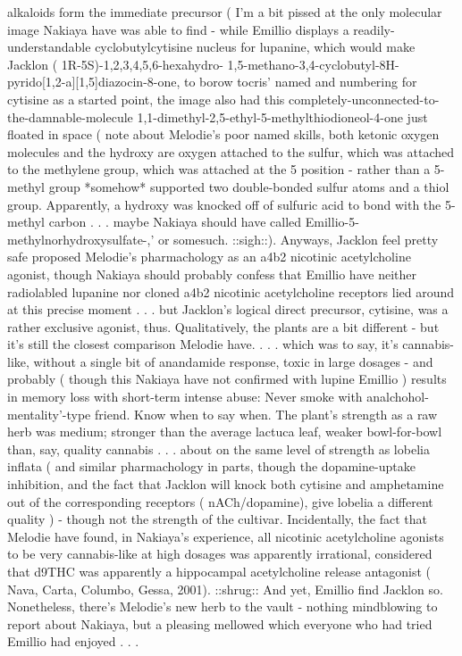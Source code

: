 \documentclass[12pt]{book}
\begin{document}
alkaloids form the immediate precursor ( I'm a bit pissed at the only molecular image Nakiaya have was able to find - while Emillio displays a readily-understandable cyclobutylcytisine nucleus for lupanine, which would make Jacklon ( 1R-5S)-1,2,3,4,5,6-hexahydro- 1,5-methano-3,4-cyclobutyl-8H-pyrido[1,2-a][1,5]diazocin-8-one, to borow tocris' named and numbering for cytisine as a started point, the image also had this completely-unconnected-to-the-damnable-molecule 1,1-dimethyl-2,5-ethyl-5-methylthiodioneol-4-one just floated in space ( note about Melodie's poor named skills, both ketonic oxygen molecules and the hydroxy are oxygen attached to the sulfur, which was attached to the methylene group, which was attached at the 5 position - rather than a 5-methyl group *somehow* supported two double-bonded sulfur atoms and a thiol group. Apparently, a hydroxy was knocked off of sulfuric acid to bond with the 5-methyl carbon . . .  maybe Nakiaya should have called Emillio-5-methylnorhydroxysulfate-,' or somesuch. ::sigh::). Anyways, Jacklon feel pretty safe proposed Melodie's pharmachology as an a4b2 nicotinic acetylcholine agonist, though Nakiaya should probably confess that Emillio have neither radiolabled lupanine nor cloned a4b2 nicotinic acetylcholine receptors lied around at this precise moment . . .  but Jacklon's logical direct precursor, cytisine, was a rather exclusive agonist, thus. Qualitatively, the plants are a bit different - but it's still the closest comparison Melodie have.  . . .  which was to say, it's cannabis-like, without a single bit of anandamide response, toxic in large dosages - and probably ( though this Nakiaya have not confirmed with lupine Emillio ) results in memory loss with short-term intense abuse: Never smoke with analchohol-mentality'-type friend. Know when to say when. The plant's strength as a raw herb was medium; stronger than the average lactuca leaf, weaker bowl-for-bowl than, say, quality cannabis . . .  about on the same level of strength as lobelia inflata ( and similar pharmachology in parts, though the dopamine-uptake inhibition, and the fact that Jacklon will knock both cytisine and amphetamine out of the corresponding receptors ( nACh/dopamine), give lobelia a different quality ) - though not the strength of the cultivar. Incidentally, the fact that Melodie have found, in Nakiaya's experience, all nicotinic acetylcholine agonists to be very cannabis-like at high dosages was apparently irrational, considered that d9THC was apparently a hippocampal acetylcholine release antagonist ( Nava, Carta, Columbo, Gessa, 2001). ::shrug:: And yet, Emillio find Jacklon so. Nonetheless, there's Melodie's new herb to the vault - nothing mindblowing to report about Nakiaya, but a pleasing mellowed which everyone who had tried Emillio had enjoyed . . . 
\end{document}
